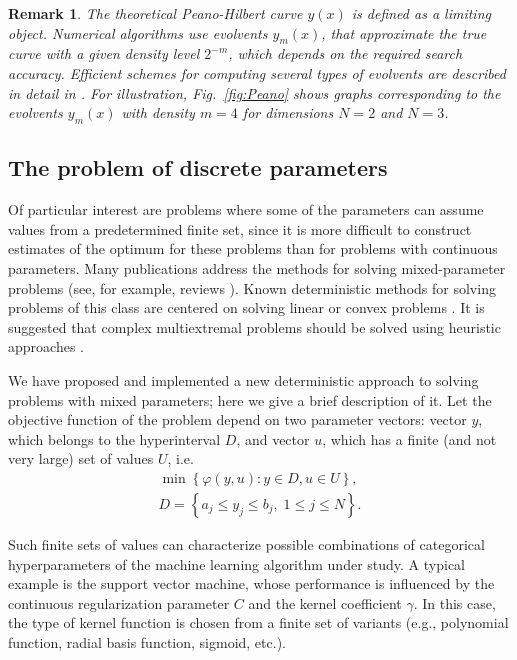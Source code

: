 \documentclass[iicol]{sn-jnl}
\theoremstyle{thmstyleone}%
\theoremstyle{thmstyletwo}%
\newtheorem{remark}{Remark}%
\theoremstyle{thmstylethree}%
\begin{document}
\begin{remark}
The theoretical Peano-Hilbert curve $y(x)$ is defined as a limiting object. Numerical algorithms use evolvents $y_m(x)$, that approximate the true curve with a given density level $2^{-m}$, which depends on the required search accuracy. Efficient schemes for computing several types of evolvents are described in detail in \citet{Sergeyev2013}. For illustration, Fig.~\ref{fig:Peano} shows graphs corresponding to the evolvents $y_m(x)$ with density $m=4$ for dimensions $N=2$ and $N=3$.
\end{remark}

\subsection{The problem of discrete parameters}\label{sec_discr} 

Of particular interest are problems where some of the parameters can assume values from a predetermined finite set, since it is more difficult to construct estimates of the optimum for these problems than for problems with continuous parameters. Many publications address the methods for solving mixed-parameter problems (see, for example, reviews \citet{Burer2012,Boukouvala2016}). Known deterministic methods for solving problems of this class are centered on solving linear or convex problems \citep{Lee2012}. It is suggested that complex multiextremal problems should be solved using heuristic approaches \citep{Belotti2013}. 

We have proposed and implemented a new deterministic approach to solving problems with mixed parameters; here we give a brief description of it. 
Let the objective function of the problem depend on two parameter vectors: vector $y$, which belongs to the hyperinterval $D$, and vector $u$, which has a finite (and not very large) set of values $U$, i.e.
\begin{gather}\label{problem_i}
\min{\left\{ \varphi(y,u) : y\in D, u \in U \right\}},\\
D=\left\{a_j \leq y_j \leq b_j, \; 1\leq j \leq N \right\}.\nonumber
\end{gather}

Such finite sets of values can characterize possible combinations of categorical hyperparameters of the machine learning algorithm under study. A typical example is the support vector machine, whose performance is influenced by the continuous regularization parameter $C$ and the kernel coefficient $\gamma$. In this case, the type of kernel function is chosen from a finite set of variants (e.g., polynomial function, radial basis function, sigmoid, etc.). 
\end{document}
